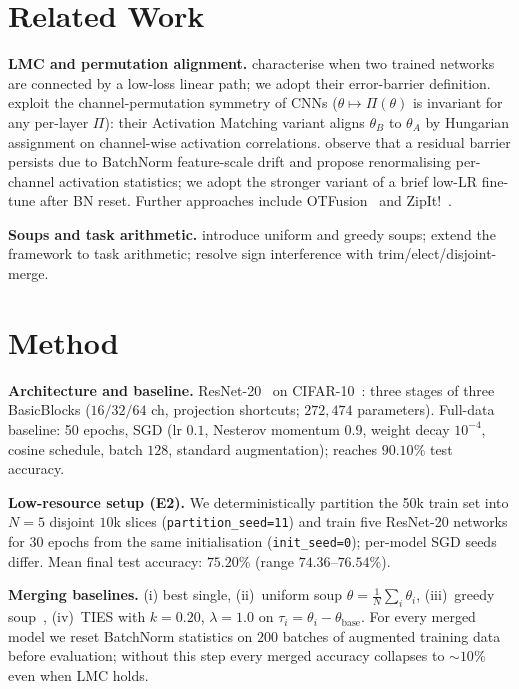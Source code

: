 \documentclass{article}
\begin{document}
\section{Related Work}

\textbf{LMC and permutation alignment.} \citet{frankle2020lmc} characterise when two trained networks are connected by a low-loss linear path; we adopt their error-barrier definition. \citet{ainsworth2023rebasin} exploit the channel-permutation symmetry of CNNs ($\theta\!\mapsto\!\Pi(\theta)$ is invariant for any per-layer $\Pi$): their Activation Matching variant aligns $\theta_B$ to $\theta_A$ by Hungarian assignment on channel-wise activation correlations. \citet{jordan2023repair} observe that a residual barrier persists due to BatchNorm feature-scale drift and propose renormalising per-channel activation statistics; we adopt the stronger variant of a brief low-LR fine-tune after BN reset. Further approaches include OTFusion~\citep{singh2020otfusion} and ZipIt!~\citep{stoica2024zipit}.

\textbf{Soups and task arithmetic.} \citet{wortsman2022soup} introduce uniform and greedy soups; \citet{ilharco2023task} extend the framework to task arithmetic; \citet{yadav2023ties} resolve sign interference with trim/elect/disjoint-merge.

\section{Method}

\textbf{Architecture and baseline.} ResNet-20~\citep{he2016resnet} on CIFAR-10~\citep{krizhevsky2009cifar}: three stages of three BasicBlocks ($16/32/64$ ch, projection shortcuts; $272{,}474$ parameters). Full-data baseline: 50 epochs, SGD (lr $0.1$, Nesterov momentum $0.9$, weight decay $10^{-4}$, cosine schedule, batch $128$, standard augmentation); reaches $90.10\%$ test accuracy.

\textbf{Low-resource setup (E2).} We deterministically partition the 50k train set into $N\!=\!5$ disjoint $10$k slices (\texttt{partition\_seed=11}) and train five ResNet-20 networks for 30 epochs from the same initialisation (\texttt{init\_seed=0}); per-model SGD seeds differ. Mean final test accuracy: $75.20\%$ (range $74.36$--$76.54\%$).

\textbf{Merging baselines.} (i) best single, (ii)~uniform soup $\theta\!=\!\tfrac{1}{N}\sum_i\theta_i$, (iii)~greedy soup~\citep[Alg.\ 1]{wortsman2022soup}, (iv)~TIES with $k\!=\!0.20$, $\lambda\!=\!1.0$ on $\tau_i\!=\!\theta_i\!-\!\theta_{\text{base}}$. For every merged model we reset BatchNorm statistics on $200$ batches of augmented training data before evaluation; without this step every merged accuracy collapses to $\sim\!10\%$ even when LMC holds.
\end{document}
